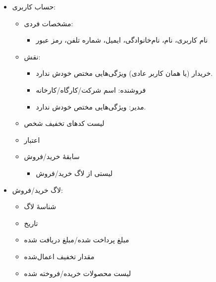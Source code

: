 \documentclass[]{article}
\begin{document}
\begin{itemize}

\item
حساب کاربری:

\begin{itemize}
\item
مشخصات فردی:

\begin{itemize}[label=$\blacksquare$]
\item
نام کاربری، نام، نام‌خانوادگی، ایمیل، شماره تلفن، رمز عبور 
\end{itemize}
\item
نقش:

\begin{itemize}[label=$\blacksquare$]
\item
خریدار (یا همان کاربر عادی) ویژگی‌هایی مختص خودش ندارد.	

\item
فروشنده: اسم شرکت/کارگاه/کارخانه

\item
مدیر: ویژگی‌هایی مختص خودش ندارد.

\end{itemize}

\item
لیست کدهای تخفیف شخص

\item
اعتبار

\item
سابقهٔ خرید/فروش

\begin{itemize}[label=$\blacksquare$]
\item
لیستی از لاگ خرید/فروش
\end{itemize}

\end{itemize}


\item
لاگ خرید/فروش:

\begin{itemize}

\item
شناسهٔ لاگ

\item
تاریخ

\item
مبلغ پرداخت شده/مبلغ دریافت شده

\item
مقدار تخفیف اعمال‌شده

\item
لیست محصولات خریده/فروخته شده


\end{itemize}
\end{itemize}
\end{document}
